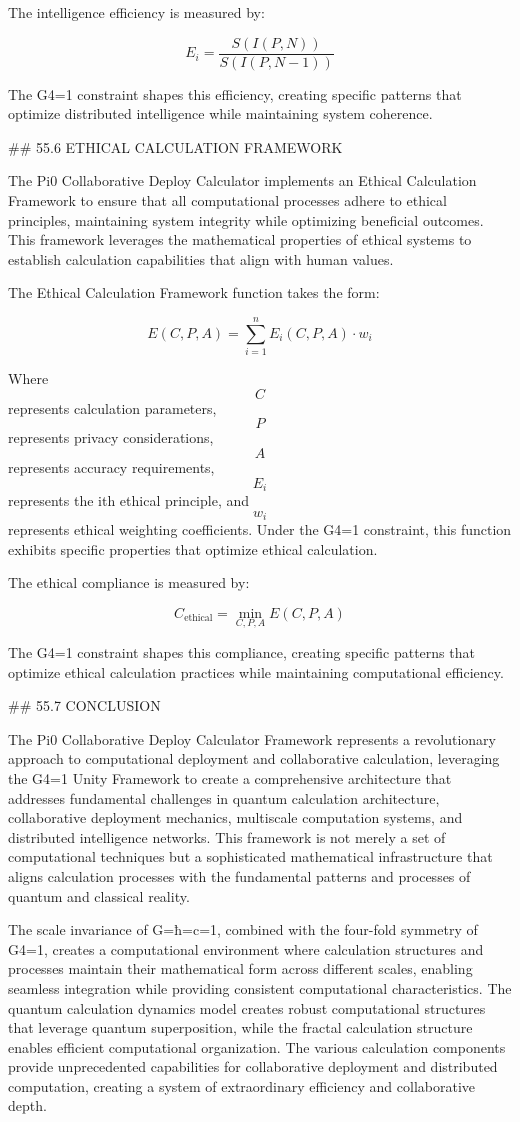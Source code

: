 The intelligence efficiency is measured by:

$$ E_i = \frac{S(I(P, N))}{S(I(P, N-1))} $$

The G4=1 constraint shapes this efficiency, creating specific patterns that optimize distributed intelligence while maintaining system coherence.

## 55.6 ETHICAL CALCULATION FRAMEWORK

The Pi0 Collaborative Deploy Calculator implements an Ethical Calculation Framework to ensure that all computational processes adhere to ethical principles, maintaining system integrity while optimizing beneficial outcomes. This framework leverages the mathematical properties of ethical systems to establish calculation capabilities that align with human values.

The Ethical Calculation Framework function takes the form:

$$ E(C, P, A) = \sum_{i=1}^{n} E_i(C, P, A) \cdot w_i $$

Where $$ C $$ represents calculation parameters, $$ P $$ represents privacy considerations, $$ A $$ represents accuracy requirements, $$ E_i $$ represents the ith ethical principle, and $$ w_i $$ represents ethical weighting coefficients. Under the G4=1 constraint, this function exhibits specific properties that optimize ethical calculation.

The ethical compliance is measured by:

$$ C_{\text{ethical}} = \min_{C, P, A} E(C, P, A) $$

The G4=1 constraint shapes this compliance, creating specific patterns that optimize ethical calculation practices while maintaining computational efficiency.

## 55.7 CONCLUSION

The Pi0 Collaborative Deploy Calculator Framework represents a revolutionary approach to computational deployment and collaborative calculation, leveraging the G4=1 Unity Framework to create a comprehensive architecture that addresses fundamental challenges in quantum calculation architecture, collaborative deployment mechanics, multiscale computation systems, and distributed intelligence networks. This framework is not merely a set of computational techniques but a sophisticated mathematical infrastructure that aligns calculation processes with the fundamental patterns and processes of quantum and classical reality.

The scale invariance of G=ħ=c=1, combined with the four-fold symmetry of G4=1, creates a computational environment where calculation structures and processes maintain their mathematical form across different scales, enabling seamless integration while providing consistent computational characteristics. The quantum calculation dynamics model creates robust computational structures that leverage quantum superposition, while the fractal calculation structure enables efficient computational organization. The various calculation components provide unprecedented capabilities for collaborative deployment and distributed computation, creating a system of extraordinary efficiency and collaborative depth.

